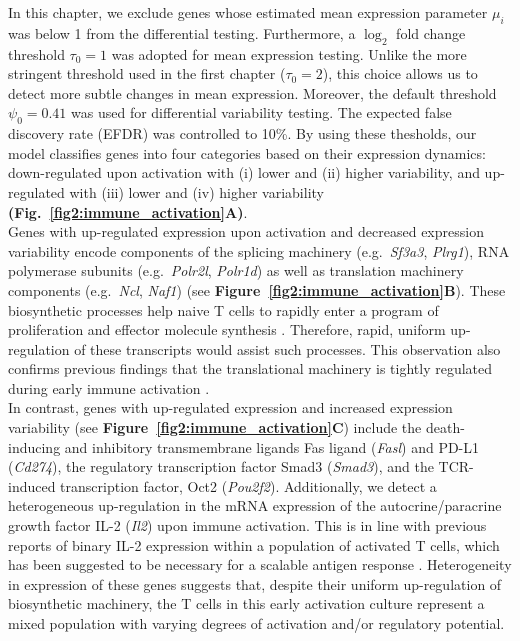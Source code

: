 In this chapter, we exclude genes whose estimated mean expression parameter $\mu_i$ was below 1 from the differential testing. Furthermore, a $\log_2$ fold change threshold $\tau_0 = 1$ was adopted for mean expression testing. Unlike the more stringent threshold used in the first chapter ($\tau_0 = 2$), this choice allows us to detect more subtle changes in mean expression. Moreover, the default threshold $\psi_0 = 0.41$ was used for differential variability testing. The expected false discovery rate (EFDR) was controlled to 10\%. By using these thesholds, our model classifies genes into four categories based on their expression dynamics: down-regulated upon activation with (i) lower and (ii) higher variability, and up-regulated with (iii) lower and (iv) higher variability \textbf{(Fig.~\ref{fig2:immune_activation}A)}. \\

Genes with up-regulated expression upon activation and decreased expression variability encode components of the splicing machinery (e.g.~\textit{Sf3a3}, \textit{Plrg1}), RNA polymerase subunits (e.g.~\textit{Polr2l}, \textit{Polr1d}) as well as translation machinery components (e.g.~\textit{Ncl}, \textit{Naf1}) (see \textbf{Figure~\ref{fig2:immune_activation}B}). These biosynthetic processes help naive T cells to rapidly enter a program of proliferation and effector molecule synthesis \citep{Tan2017,Araki2017}. Therefore, rapid, uniform up-regulation of these transcripts would assist such processes. This observation also confirms previous findings that the translational machinery is tightly regulated during early immune activation \citep{Martinez-jimenez2017}.\\ 

In contrast, genes with up-regulated expression and increased expression variability (see \textbf{Figure~\ref{fig2:immune_activation}C}) include the death-inducing and inhibitory transmembrane ligands Fas ligand (\textit{Fasl}) and PD-L1 (\textit{Cd274}), the regulatory transcription factor Smad3 (\textit{Smad3}), and the TCR-induced transcription factor, Oct2 (\textit{Pou2f2}). Additionally, we detect a heterogeneous up-regulation in the mRNA expression of the autocrine/paracrine growth factor IL-2 (\textit{Il2}) upon immune activation. This is in line with previous reports of binary IL-2 expression within a population of activated T cells, which has been suggested to be necessary for a scalable antigen response \citep{Fuhrmann2016}. Heterogeneity in expression of these genes suggests that, despite their uniform up-regulation of biosynthetic machinery, the T cells in this early activation culture represent a mixed population with varying degrees of activation and/or regulatory potential. \\

